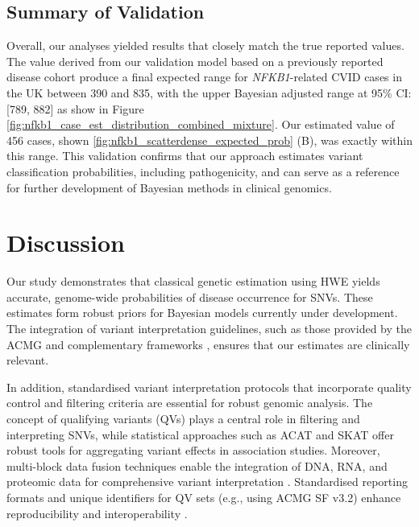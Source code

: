 \subsection{Summary of Validation}
Overall, our analyses yielded results that closely match the true reported values. The value derived from our validation model based on a previously reported disease cohort \cite{tuijnenburgNFKB12018} 
produce a final expected range for \textit{NFKB1}-related CVID cases in the UK between 390 and 835, with the upper Bayesian adjusted range at 95\% CI: [789, 882] as show in Figure
\ref{fig:nfkb1_case_est_distribution_combined_mixture}. 
Our estimated value of 456 cases, shown 
\ref{fig:nfkb1_scatterdense_expected_prob} (B), was exactly within this range.
This validation confirms that our approach estimates variant classification probabilities, including pathogenicity, and can serve as a reference for further development of Bayesian methods in clinical genomics.


\section{Discussion}
Our study demonstrates that classical genetic estimation using HWE yields accurate, genome-wide probabilities of disease occurrence for SNVs. These estimates form robust priors for Bayesian models currently under development. The integration of variant interpretation guidelines, such as those provided by the ACMG \citep{richards2015standards} and complementary frameworks \citep{tavtigian2020fitting,li2017intervar}, ensures that our estimates are clinically relevant.

In addition, standardised variant interpretation protocols that incorporate quality control and filtering criteria \citep{pedersen2021effective,anderson2010data} are essential for robust genomic analysis. The concept of qualifying variants (QVs) \citep{cirulli2015exome,tavtigian2020fitting} plays a central role in filtering and interpreting SNVs, while statistical approaches such as ACAT and SKAT \citep{liu2019acat,li2020dynamic,wu2011rare,lee2012optimal} offer robust tools for aggregating variant effects in association studies. Moreover, multi-block data fusion techniques enable the integration of DNA, RNA, and proteomic data for comprehensive variant interpretation \citep{kong2018nature,howe2021within}. Standardised reporting formats and unique identifiers for QV sets (e.g., using ACMG SF v3.2) enhance reproducibility and interoperability \citep{miller2023acmg}.

